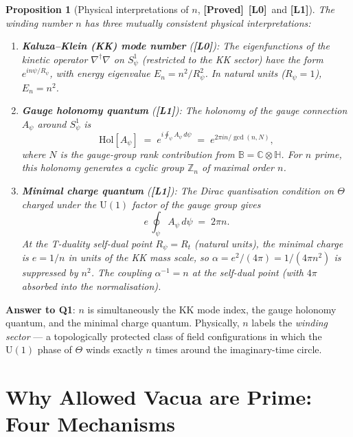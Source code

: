\documentclass[12pt,a4paper]{article}
\newtheorem{proposition}[theorem]{Proposition}
\theoremstyle{definition}
\theoremstyle{remark}
\newcommand{\BB}{\mathbb{B}}
\newcommand{\CC}{\mathbb{C}}
\newcommand{\HH}{\mathbb{H}}
\newcommand{\ZZ}{\mathbb{Z}}
\newcommand{\PROVED}{\textbf{[Proved]}}
\newcommand{\Lone}{\textbf{[L1]}}
\newcommand{\Lzero}{\textbf{[L0]}}
\begin{document}
\begin{proposition}[Physical interpretations of $n$, \PROVED\ \Lzero\ and \Lone]
\label{prop:psp:interpretations}
The winding number $n$ has three mutually consistent physical interpretations:
\begin{enumerate}
  \item \textbf{Kaluza--Klein (KK) mode number} (\Lzero):
        The eigenfunctions of the kinetic operator $\nabla^\dagger\nabla$
        on $S^1_\psi$ (restricted to the KK sector) have the form
        $e^{in\psi/R_\psi}$, with energy eigenvalue $E_n = n^2/R_\psi^2$.
        In natural units ($R_\psi = 1$), $E_n = n^2$.

  \item \textbf{Gauge holonomy quantum} (\Lone):
        The holonomy of the gauge connection $A_\psi$ around $S^1_\psi$ is
        \[
          \mathrm{Hol}[A_\psi]
          \;=\; e^{i\oint_\psi A_\psi\,d\psi}
          \;=\; e^{2\pi i n / \gcd(n,N)},
        \]
        where $N$ is the gauge-group rank contribution from
        $\BB = \CC\otimes\HH$.  For $n$ prime,
        this holonomy generates a cyclic group $\ZZ_n$ of maximal order $n$.

  \item \textbf{Minimal charge quantum} (\Lone):
        The Dirac quantisation condition on $\Theta$ charged under the
        $\mathrm{U}(1)$ factor of the gauge group gives
        \[
          e\,\oint_\psi A_\psi\,d\psi \;=\; 2\pi n.
        \]
        At the T-duality self-dual point $R_\psi = R_t$ (natural units), the
        minimal charge is $e = 1/n$ in units of the KK mass scale, so
        $\alpha = e^2/(4\pi) = 1/(4\pi n^2)$ is suppressed by $n^2$.
        The coupling $\alpha^{-1} = n$ at the self-dual point (with
        $4\pi$ absorbed into the normalisation).
\end{enumerate}
\end{proposition}

\begin{resultbox}
\textbf{Answer to Q1}: $n$ is simultaneously the KK mode index, the gauge
holonomy quantum, and the minimal charge quantum.  Physically, $n$ labels the
\emph{winding sector} — a topologically protected class of field configurations
in which the $\mathrm{U}(1)$ phase of $\Theta$ winds exactly $n$ times around
the imaginary-time circle.
\end{resultbox}

\section{Why Allowed Vacua are Prime: Four Mechanisms}
\label{sec:psp:mechanisms}
\end{document}
